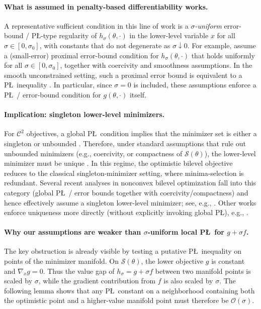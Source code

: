 \documentclass{article}
\theoremstyle{normaltheorem}
\newcommand{\calS}{\mathcal{S}}
\newcommand{\minimaselection}{{minima-selection}\xspace}
\begin{document}
\paragraph{What is assumed in penalty-based differentiability works.}
A representative sufficient condition in this line of work is a \emph{$\sigma$-uniform} error-bound / P\L-type regularity of $h_\sigma(\theta,\cdot)$ in the lower-level variable $x$ for all $\sigma\in[0,\sigma_0]$, with constants that do not degenerate as $\sigma\downarrow 0$.
For example, \citet{kwon2023penalty} assume a (small-error) proximal error-bound condition for $h_\sigma(\theta,\cdot)$ that holds uniformly for all $\sigma\in[0,\sigma_0]$, together with coercivity and smoothness assumptions.
In the smooth unconstrained setting, such a proximal error bound is equivalent to a P\L\ inequality \citep[Prop.~C.1]{chen2023bilevel}.
In particular, since $\sigma=0$ is included, these assumptions enforce a P\L\ / error-bound condition for $g(\theta,\cdot)$ itself.

\paragraph{Implication: singleton lower-level minimizers.}
For \(\mathcal{C}^{2}\) objectives, a global P\L\ condition implies that the minimizer set is either a singleton or unbounded \citep{criscitiello2025}.
Therefore, under standard assumptions that rule out unbounded minimizers (e.g., coercivity, or compactness of $\calS(\theta)$), the lower-level minimizer must be unique \citep{masiha2025superquantile}.
In this regime, the optimistic bilevel objective reduces to the classical singleton-minimizer setting, where \minimaselection is redundant.
Several recent analyses in nonconvex bilevel optimization fall into this category (global P\L\ / error bounds together with coercivity/compactness) and hence effectively assume a singleton lower-level minimizer; see, e.g., \citet{huang2024optimal,kwon2023penalty}.
Other works enforce uniqueness more directly (without explicitly invoking global P\L), e.g., \citet{liu2022bome}.

\paragraph{Why our assumptions are weaker than $\sigma$-uniform local P\L\ for \(g+\sigma f\).}
The key obstruction is already visible by testing a putative P\L\ inequality on points of the minimizer manifold.
On \(\calS(\theta)\), the lower objective \(g\) is constant and \(\nabla_x g=0\). Thus the value gap of
\(h_\sigma=g+\sigma f\) between two manifold points is scaled by \(\sigma\), while the gradient contribution from
\(f\) is also scaled by \(\sigma\). The following lemma shows that any P\L\ constant on a neighborhood containing both
the optimistic point and a higher-value manifold point must therefore be \(\mathcal{O}(\sigma)\).
\end{document}
